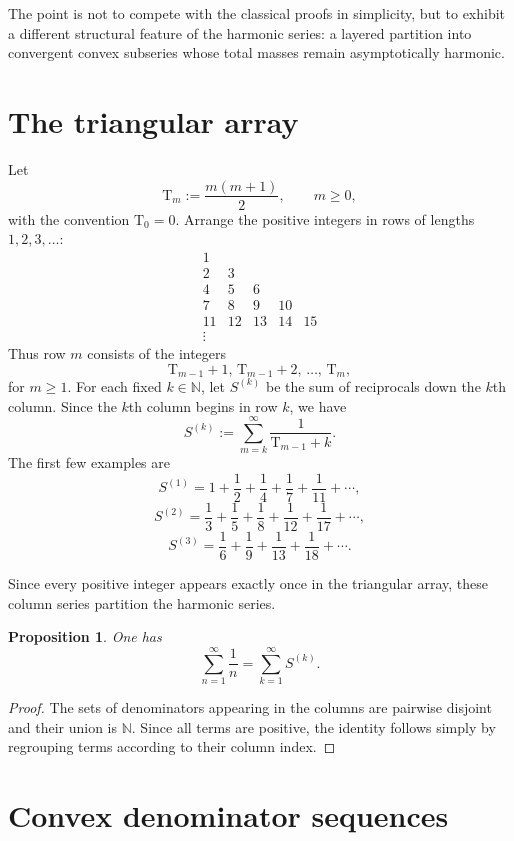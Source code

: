 \documentclass[11pt]{article}
\newtheorem{proposition}{Proposition}
\newcommand{\N}{\mathbb{N}}
\newcommand{\T}{\mathrm{T}}
\begin{document}
The point is not to compete with the classical proofs in simplicity, but to exhibit a different structural feature of the harmonic series: a layered partition into convergent convex subseries whose total masses remain asymptotically harmonic.

\section{The triangular array}

Let
\[
\T_m := \frac{m(m+1)}{2}, \qquad m \ge 0,
\]
with the convention $\T_0=0$. Arrange the positive integers in rows of lengths $1,2,3,\dots$:
\[
\begin{matrix}
1\\[2pt]
2 & 3\\[2pt]
4 & 5 & 6\\[2pt]
7 & 8 & 9 & 10\\[2pt]
11 & 12 & 13 & 14 & 15\\[2pt]
\vdots
\end{matrix}
\]
Thus row $m$ consists of the integers
\[
\T_{m-1}+1,\, \T_{m-1}+2,\, \dots,\, \T_m,
\]
for $m \ge 1$. For each fixed $k \in \N$, let $S^{(k)}$ be the sum of reciprocals down the $k$th column. Since the $k$th column begins in row $k$, we have
\begin{equation}\label{eq:Sk-def}
S^{(k)} := \sum_{m=k}^{\infty} \frac{1}{\T_{m-1}+k}.
\end{equation}
The first few examples are
\[
S^{(1)} = 1 + \frac12 + \frac14 + \frac17 + \frac1{11} + \cdots,
\]
\[
S^{(2)} = \frac13 + \frac15 + \frac18 + \frac1{12} + \frac1{17} + \cdots,
\]
\[
S^{(3)} = \frac16 + \frac19 + \frac1{13} + \frac1{18} + \cdots.
\]

Since every positive integer appears exactly once in the triangular array, these column series partition the harmonic series.

\begin{proposition}\label{prop:partition}
One has
\[
\sum_{n=1}^{\infty} \frac{1}{n} = \sum_{k=1}^{\infty} S^{(k)}.
\]
\end{proposition}

\begin{proof}
The sets of denominators appearing in the columns are pairwise disjoint and their union is $\N$. Since all terms are positive, the identity follows simply by regrouping terms according to their column index.
\end{proof}

\section{Convex denominator sequences}
\end{document}
